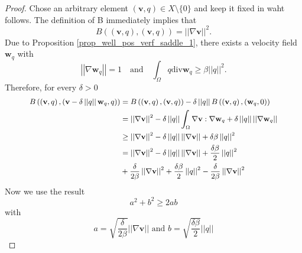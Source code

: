 \documentclass[12pt,a4paper]{article}
\theoremstyle{definition}
\begin{document}
\begin{proof}
Chose an arbitrary element $\left(\textbf{v},q\right)\in X\setminus \lbrace 0 \rbrace$ and keep it fixed in waht follows.  The definition of B immediately implies that 
\begin{equation}\nonumber
B\left(\left(\textbf{v},q\right),\left(\textbf{v},q\right)\right)= \left|\left|\nabla \textbf{v}\right|\right|^2.
\end{equation}
Due to Proposition \ref{prop_well_pos_verf_saddle_1}, there exists a velocity field $\textbf{w}_q$ with
\begin{equation}\nonumber
\left|\left|\nabla \textbf{w}_q\right|\right|=1 \quad \text{and}\quad \int_{\Omega}q \text{div} \textbf{w}_q \geq \beta \left|\left|q\right|\right|^2.
\end{equation}
Therefore, for every $\delta > 0$
\begin{equation}\nonumber\small
\begin{aligned}\small
B\left(\left(\textbf{v},q\right),\left(\textbf{v}-\delta\left|\left|q\right|\right|\textbf{w}_q,q\right)\right) &= B\left(\left(\textbf{v},q\right),\left(\textbf{v},q\right)\right)-\delta\left|\left|q\right|\right|B\left(\left(\textbf{v},q\right),\left(\textbf{w}_q,0\right)\right)\\
&=\left|\left|\nabla \textbf{v}\right|\right|^2 -  \delta\left|\left|q\right|\right|\int_{\Omega}\nabla\textbf{v}:\nabla\textbf{w}_q +\delta\left|\left|q\right|\right|\left|\left|\nabla \textbf{w}_q\right|\right|\\
&\geq \left|\left|\nabla \textbf{v}\right|\right|^2 -  \delta\left|\left|q\right|\right|\left|\left|\nabla \textbf{v}\right|\right| +\delta \beta \left|\left|q\right|\right|^2\\
&= \left|\left|\nabla \textbf{v}\right|\right|^2 -  \delta\left|\left|q\right|\right|\left|\left|\nabla \textbf{v}\right|\right| +\frac{\delta \beta }{2}\left|\left|q\right|\right|^2\\& + \frac{\delta}{2\beta}\left|\left|\nabla\textbf{v}\right|\right|^2 +\frac{\delta \beta }{2}\left|\left|q\right|\right|^2 - \frac{\delta}{2\beta}\left|\left|\nabla\textbf{v}\right|\right|^2
\end{aligned}
\end{equation}
Now we use the result
\begin{equation}
a^2+b^2\geq 2ab \nonumber
\end{equation}
with \begin{equation}\nonumber
a=\sqrt{\frac{\delta}{2\beta}}\left|\left|\nabla\textbf{v}\right|\right|\text{ and } b = \sqrt{\frac{\delta \beta }{2}}\left|\left|q\right|\right|

\end{equation}
\end{proof}
\end{document}

